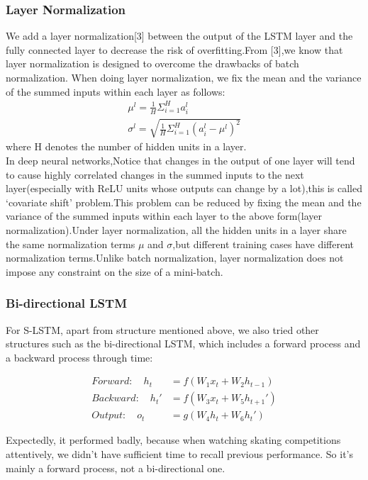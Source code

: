 \documentclass{article}
\begin{document}
\subsubsection{Layer Normalization}
We add a layer normalization[3] between the output of the LSTM layer and the fully connected layer to decrease the risk of overfitting.From [3],we know that layer normalization is designed to overcome the drawbacks of batch normalization. When doing layer normalization, we fix the mean and the variance of the summed inputs within each layer as follows:
\begin{align}
\mu^{l}=\frac{1}{H}\Sigma^{H}_{i=1}a_{i}^{l}\\
\sigma^{l}=\sqrt{\frac{1}{H}\Sigma^{H}_{i=1}(a_{i}^{l}-\mu^{l})^{2}}
\end{align}
where H denotes the number of hidden units in a layer.\\
In deep neural networks,Notice that changes in the output of one layer will tend to cause highly correlated changes in the summed inputs to the next layer(especially with ReLU units whose outputs can change by a lot),this is called `covariate shift' problem.This problem can be reduced by fixing the mean and the variance of the summed inputs within each layer to the above form(layer normalization).Under layer normalization, all the hidden units in a layer share the same normalization terms $\mu$ and $\sigma$,but different training cases have different normalization terms.Unlike batch normalization, layer normalization does not impose any constraint on the size of a mini-batch.


\subsubsection{Bi-directional LSTM}
For S-LSTM, apart from structure mentioned above, we also tried other structures such as the bi-directional LSTM, which includes a forward process and a backward process through time:

\begin{align}
Forward:\quad h_t&=f(W_1x_t+W_2h_{t-1})\\
Backward:\quad h_t'&=f(W_3x_t+W_5h_{t+1}')\\
Output:\quad o_t&=g(W_4h_t+W_6h_t')
\end{align}

Expectedly, it performed badly, because when watching skating competitions attentively, we didn't have sufficient time to recall previous performance. So it's mainly a forward process, not a bi-directional one.\par
\end{document}

